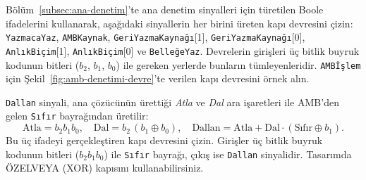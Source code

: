 \begin{alistirma}[\orta]
Bölüm~\ref{subsec:ana-denetim}'te ana denetim sinyalleri için türetilen Boole ifadelerini kullanarak, aşağıdaki sinyallerin her birini üreten kapı devresini çizin: \texttt{YazmacaYaz}, \texttt{AMBKaynak}, \texttt{GeriYazmaKaynağı}[1], \texttt{GeriYazmaKaynağı}[0], \texttt{AnlıkBiçim}[1], \texttt{AnlıkBiçim}[0] ve \texttt{BelleğeYaz}. Devrelerin girişleri üç bitlik buyruk kodunun bitleri ($b_2$, $b_1$, $b_0$) ile gereken yerlerde bunların tümleyenleridir. \texttt{AMBİşlem} için Şekil~\ref{fig:amb-denetimi-devre}'te verilen kapı devresini örnek alın.
\end{alistirma}

\begin{alistirma}[\zor]
\texttt{Dallan} sinyali, ana çözücünün ürettiği \emph{Atla} ve \emph{Dal} ara işaretleri ile AMB'den gelen \texttt{Sıfır} bayrağından üretilir:
\[
\text{Atla} = b_2 b_1 b_0, \quad \text{Dal} = b_2\,(b_1 \oplus b_0), \quad \text{Dallan} = \text{Atla} + \text{Dal}\cdot(\text{Sıfır} \oplus b_1).
\]
Bu üç ifadeyi gerçekleştiren kapı devresini çizin. Girişler üç bitlik buyruk kodunun bitleri ($b_2 b_1 b_0$) ile \texttt{Sıfır} bayrağı, çıkış ise \texttt{Dallan} sinyalidir. Tasarımda ÖZELVEYA (XOR) kapısını kullanabilirsiniz.
\end{alistirma}
